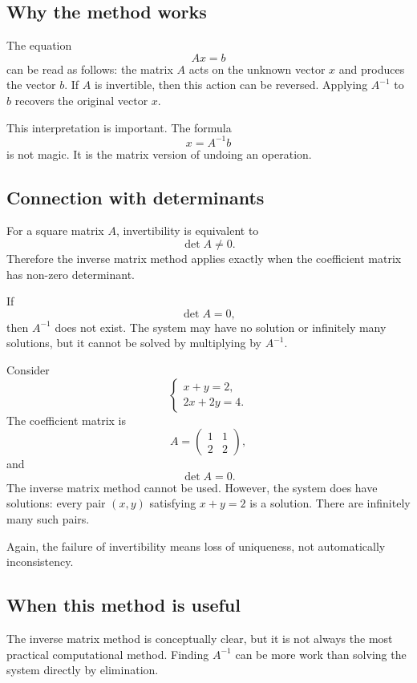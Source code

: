 \subsection*{Why the method works}

The equation
\[
Ax=b
\]
can be read as follows: the matrix \(A\) acts on the unknown vector \(x\) and produces the vector \(b\). If \(A\) is invertible, then this action can be reversed. Applying \(A^{-1}\) to \(b\) recovers the original vector \(x\).

This interpretation is important. The formula
\[
x=A^{-1}b
\]
is not magic. It is the matrix version of undoing an operation.

\subsection*{Connection with determinants}

For a square matrix \(A\), invertibility is equivalent to
\[
\det A\ne0.
\]
Therefore the inverse matrix method applies exactly when the coefficient matrix has non-zero determinant.

If
\[
\det A=0,
\]
then \(A^{-1}\) does not exist. The system may have no solution or infinitely many solutions, but it cannot be solved by multiplying by \(A^{-1}\).

\begin{examplebox}
Consider
\[
\begin{cases}
x+y=2,\\
2x+2y=4.
\end{cases}
\]
The coefficient matrix is
\[
A=\begin{pmatrix}1&1\\2&2\end{pmatrix},
\]
and
\[
\det A=0.
\]
The inverse matrix method cannot be used. However, the system does have solutions: every pair \((x,y)\) satisfying \(x+y=2\) is a solution. There are infinitely many such pairs.
\end{examplebox}

Again, the failure of invertibility means loss of uniqueness, not automatically inconsistency.

\subsection*{When this method is useful}

The inverse matrix method is conceptually clear, but it is not always the most practical computational method. Finding \(A^{-1}\) can be more work than solving the system directly by elimination.

